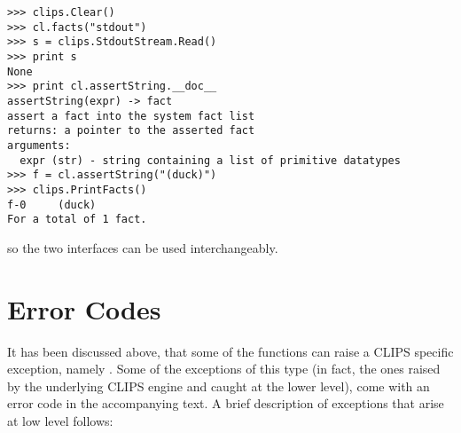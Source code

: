 \begin{verbatim}
>>> clips.Clear()
>>> cl.facts("stdout")
>>> s = clips.StdoutStream.Read()
>>> print s
None
>>> print cl.assertString.__doc__
assertString(expr) -> fact
assert a fact into the system fact list
returns: a pointer to the asserted fact
arguments:
  expr (str) - string containing a list of primitive datatypes
>>> f = cl.assertString("(duck)")
>>> clips.PrintFacts()
f-0     (duck)
For a total of 1 fact.
\end{verbatim}

so the two interfaces can be used interchangeably.



\chapter{Error Codes}%
\label{pyclips-errors}

It has been discussed above, that some of the \pyclips{} functions can
raise a CLIPS specific exception, namely . Some
of the exceptions of this type (in fact, the ones raised by the
underlying CLIPS engine and caught at the lower level), come with an
error code in the accompanying text. A brief description of exceptions
that arise at low level follows:

